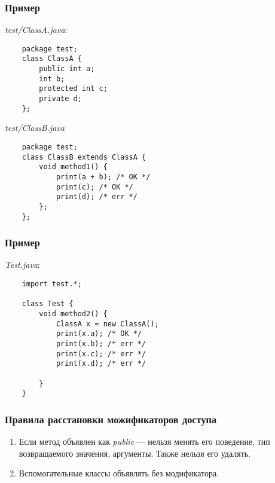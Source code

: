 \begin{frame}[fragile]
	\frametitle{Пример}

	\emph{test/ClassA.java}:
	\begin{verbatim}
	package test;
	class ClassA {
	    public int a;
	    int b;
	    protected int c;
	    private d;
	};
	\end{verbatim}

	\emph{test/ClassB.java}
	\begin{verbatim}
	package test;
	class ClassB extends ClassA {
	    void method1() {
	        print(a + b); /* OK */
	        print(c); /* OK */
	        print(d); /* err */
	    };
	};
	\end{verbatim}
\end{frame}

\begin{frame}[fragile]
	\frametitle{Пример}
	\emph{Test.java}:
	\begin{verbatim}
	import test.*;

	class Test {
	    void method2() {
	        ClassA x = new ClassA();
	        print(x.a); /* OK */
	        print(x.b); /* err */
	        print(x.c); /* err */
	        print(x.d); /* err */

	    }
	}
	\end{verbatim}

\end{frame}

\begin{frame}[fragile]
	\frametitle{Правила расстановки можификаторов доступа}
	\begin{enumerate}
	\begin{item}
	Поля делать \emph{private}. Eсли нужно получать доступ к полю извне --- написать методы для этого, например
	\begin{verbatim}
	class ClassA {
	    private int x;
	    int getX() { return x; }
	    void setX(int x) { this.x = x; }
	}
	\end{verbatim}
	\end{item}
	\item{Если метод объявлен как \emph{public} --- нельзя менять его поведение, тип возвращаемого значения, аргументы. Также нельзя его удалять.}
	\item{Вспомогательные классы объявлять без модификатора.}

	\end{enumerate}
\end{frame}

